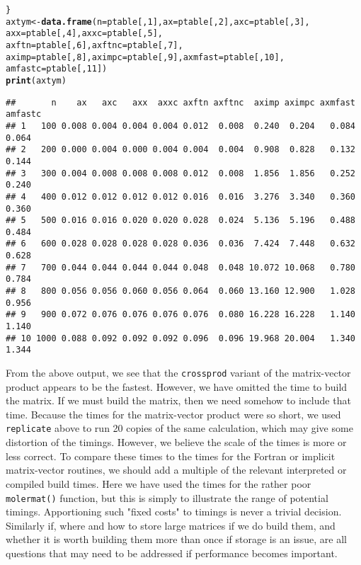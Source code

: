 \documentclass[10pt]{article}\usepackage[]{graphicx}\usepackage[]{color}
\makeatletter
\newcommand{\hlnum}[1]{\textcolor[rgb]{0.686,0.059,0.569}{#1}}%
\newcommand{\hlstd}[1]{\textcolor[rgb]{0.345,0.345,0.345}{#1}}%
\newcommand{\hlkwb}[1]{\textcolor[rgb]{0.69,0.353,0.396}{#1}}%
\newcommand{\hlkwc}[1]{\textcolor[rgb]{0.333,0.667,0.333}{#1}}%
\newcommand{\hlkwd}[1]{\textcolor[rgb]{0.737,0.353,0.396}{\textbf{#1}}}%
\newenvironment{kframe}{%
 \def\at@end@of@kframe{}%
 \ifinner\ifhmode%
  \def\at@end@of@kframe{\end{minipage}}%
  \begin{minipage}{\columnwidth}%
 \fi\fi%
 \def\FrameCommand##1{\hskip\@totalleftmargin \hskip-\fboxsep
 \colorbox{shadecolor}{##1}\hskip-\fboxsep
     \hskip-\linewidth \hskip-\@totalleftmargin \hskip\columnwidth}%
 \MakeFramed {\advance\hsize-\width
   \@totalleftmargin\z@ \linewidth\hsize
   \@setminipage}}%
 {\par\unskip\endMakeFramed%
 \at@end@of@kframe}
\newenvironment{knitrout}{}{} %
\newcommand{\code}[1]{{\tt #1}}
\makeatother
\begin{document}
\begin{knitrout}
\begin{kframe}
\begin{alltt}
\hlstd{\}}
\hlstd{axtym}\hlkwb{<-}\hlkwd{data.frame}\hlstd{(}\hlkwc{n}\hlstd{=ptable[,}\hlnum{1}\hlstd{],} \hlkwc{ax}\hlstd{=ptable[,}\hlnum{2}\hlstd{],} \hlkwc{axc}\hlstd{=ptable[,}\hlnum{3}\hlstd{],}
  \hlkwc{axx}\hlstd{=ptable[,}\hlnum{4}\hlstd{],} \hlkwc{axxc}\hlstd{=ptable[,}\hlnum{5}\hlstd{],}
  \hlkwc{axftn}\hlstd{=ptable[,}\hlnum{6}\hlstd{],} \hlkwc{axftnc}\hlstd{=ptable[,}\hlnum{7}\hlstd{],}
  \hlkwc{aximp}\hlstd{=ptable[,}\hlnum{8}\hlstd{],} \hlkwc{aximpc}\hlstd{=ptable[,}\hlnum{9}\hlstd{],} \hlkwc{axmfast}\hlstd{=ptable[,}\hlnum{10}\hlstd{],}
  \hlkwc{amfastc}\hlstd{=ptable[,}\hlnum{11}\hlstd{])}
\hlkwd{print}\hlstd{(axtym)}
\end{alltt}
\begin{verbatim}
##       n    ax   axc   axx  axxc axftn axftnc  aximp aximpc axmfast amfastc
## 1   100 0.008 0.004 0.004 0.004 0.012  0.008  0.240  0.204   0.084   0.064
## 2   200 0.000 0.004 0.000 0.004 0.004  0.004  0.908  0.828   0.132   0.144
## 3   300 0.004 0.008 0.008 0.008 0.012  0.008  1.856  1.856   0.252   0.240
## 4   400 0.012 0.012 0.012 0.012 0.016  0.016  3.276  3.340   0.360   0.360
## 5   500 0.016 0.016 0.020 0.020 0.028  0.024  5.136  5.196   0.488   0.484
## 6   600 0.028 0.028 0.028 0.028 0.036  0.036  7.424  7.448   0.632   0.628
## 7   700 0.044 0.044 0.044 0.044 0.048  0.048 10.072 10.068   0.780   0.784
## 8   800 0.056 0.056 0.060 0.056 0.064  0.060 13.160 12.900   1.028   0.956
## 9   900 0.072 0.076 0.076 0.076 0.076  0.080 16.228 16.228   1.140   1.140
## 10 1000 0.088 0.092 0.092 0.092 0.096  0.096 19.968 20.004   1.340   1.344
\end{verbatim}
\end{kframe}
\end{knitrout}

From the above output, we see that the \code{crossprod} variant of the 
matrix-vector product appears to be the fastest. However, we have omitted
the time to build the matrix. If we must build the matrix, then we need 
somehow to include that time. Because the times for the matrix-vector 
product were so short, we used \code{replicate} above to run 20 copies 
of the same calculation, which may give some distortion of the timings.
However, we believe the scale of the times is more or less correct. To 
compare these times to the times for the Fortran or implicit matrix-vector
routines, we should add a multiple of the relevant interpreted or
compiled build times. Here we have used the times for the rather poor
\code{molermat()} function, but this is simply to illustrate the range
of potential timings. Apportioning such "fixed costs" to timings is
never a trivial decision. Similarly if, where and how to store
large matrices if we do build them, and whether it is worth building
them more than once if storage is an issue, are all questions that 
may need to be addressed if performance becomes important.
\end{document}
